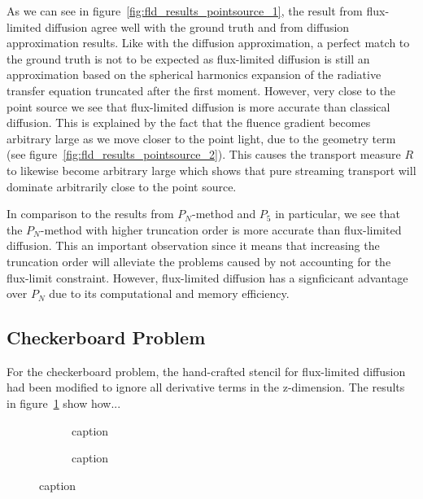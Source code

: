 
As we can see in figure~\ref{fig:fld_results_pointsource_1}, the result from flux-limited diffusion agree well with the ground truth and from diffusion approximation results. Like with the diffusion approximation, a perfect match to the ground truth is not to be expected as flux-limited diffusion is still an approximation based on the spherical harmonics expansion of the radiative transfer equation truncated after the first moment. However, very close to the point source we see that flux-limited diffusion is more accurate than classical diffusion. This is explained by the fact that the fluence gradient becomes arbitrary large as we move closer to the point light, due to the geometry term (see figure~\ref{fig:fld_results_pointsource_2}). This causes the transport measure $R$ to likewise become arbitrary large which shows that pure streaming transport will dominate arbitrarily close to the point source.

In comparison to the results from $P_N$-method and $P_5$ in particular, we see that the $P_N$-method with higher truncation order is more accurate than flux-limited diffusion. This an important observation since it means that increasing the truncation order will alleviate the problems caused by not accounting for the flux-limit constraint. However, flux-limited diffusion has a signficicant advantage over $P_N$ due to its computational and memory efficiency.

\subsection{Checkerboard Problem}
\label{sec:pn_results_checkerboard}

For the checkerboard problem, the hand-crafted stencil for flux-limited diffusion had been modified to ignore all derivative terms in the z-dimension. The results in figure~\ref{fig:fld_results_checkerboard_1} show how...
\begin{figure}[h]
\centering
\begin{subfigure}{0.49\columnwidth}
\caption{caption}
\label{fig:fld_results_checkerboard_1}
\end{subfigure}%
\hspace{0.01\columnwidth}
\begin{subfigure}{0.49\columnwidth}
\caption{caption}
\label{fig:fld_results_checkerboard_2}
\end{subfigure}%
\caption{caption}
\label{fig:fld_results_checkerboard}
\end{figure}


